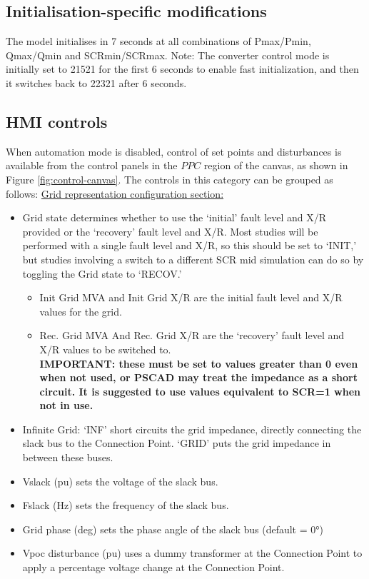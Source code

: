 \documentclass{../grid-link-report}
\begin{document}
	\subsection{Initialisation-specific modifications}
	
	The model initialises in 7 seconds at all combinations of Pmax/Pmin, Qmax/Qmin and SCRmin/SCRmax. Note: The converter control mode is initially set to 21521 for the first 6 seconds to enable fast initialization, and then it switches back to 22321 after 6 seconds.
	
	
	\subsection{HMI controls}
	
	When automation mode is disabled, control of set points and disturbances is available from the control panels in the $PPC$ region of the canvas, as shown in Figure \ref{fig:control-canvas}. The controls in this category can be grouped as follows:
	\underline{Grid representation configuration section:}
	\begin{itemize}	
		\item Grid state determines whether to use the ‘initial’ fault level and X/R provided or the ‘recovery’ fault level and X/R. Most studies will be performed with a single fault level and X/R, so this should be set to ‘INIT,’ but studies involving a switch to a different SCR mid simulation can do so by toggling the Grid state to ‘RECOV.’
		\begin{itemize}	
			\item Init Grid MVA and Init Grid X/R are the initial fault level and X/R values for the grid.
			\item Rec. Grid MVA And Rec. Grid X/R are the ‘recovery’ fault level and X/R values to be switched to.\\ \bfseries{IMPORTANT: these must be set to values greater than 0 even when not used, or PSCAD may treat the impedance as a short circuit. It is suggested to use values equivalent to SCR=1 when not in use.}
		\end{itemize} 
		\item Infinite Grid: ‘INF’ short circuits the grid impedance, directly connecting the slack bus to the Connection Point. ‘GRID’ puts the grid impedance in between these buses.	
		\item Vslack (pu) sets the voltage of the slack bus.
		\item Fslack (Hz) sets the frequency of the slack bus.
		\item Grid phase (deg) sets the phase angle of the slack bus (default = 0°)
		\item Vpoc disturbance (pu) uses a dummy transformer at the Connection Point to apply a percentage voltage change at the Connection Point.
	\end{itemize}
\end{document}
